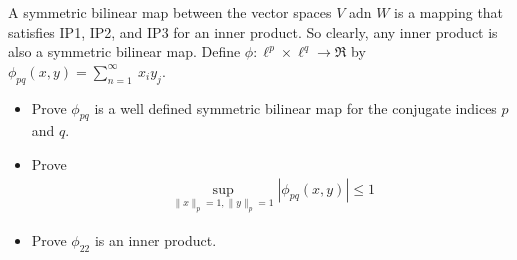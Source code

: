 \documentclass[11pt]{SelfArxOneColBMN}
\begin{document}
\begin{exercise}
  A symmetric bilinear map between the vector spaces $V$ adn $W$ is a mapping that satisfies IP1, IP2, and IP3 for an inner product. So clearly, any inner product is also a symmetric bilinear map. Define $\phi: \ell^p \times \ell^q \rightarrow \Re$ by $\phi_{pq}(x,y) = \sum_{n = 1}^\infty\:x_iy_j$.
  \begin{itemize}
    \item Prove $\phi_{pq}$ is a well defined symmetric bilinear map for the conjugate indices $p$ and $q$.
    \item Prove 
    \begin{eqnarray*}
      \sup_{\|x\|_p=1,\|y\|_p=1}|\phi_{pq}(x,y)| \leq 1
    \end{eqnarray*}
    \item Prove $\phi_{22}$ is an inner product.
  \end{itemize}
\end{exercise}
\end{document}
